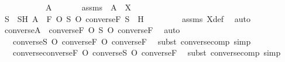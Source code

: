 \begin{isabellebody}
\ \ \isamarkupfalse%
\ {\isacharminus}{\kern0pt}\ \isanewline
\ \ \ \ \isamarkupfalse%
\ A\ \isanewline
\ \ \ \ \isamarkupfalse%
\ assms{}\ {\isacharcolon}{\kern0pt}\ {\isachardoublequoteopen}A\ {\isasymin}\ X{\isachardoublequoteclose}\isanewline
\ \ \ \ \isamarkupfalse%
\ S\ \ SH{\isacharcolon}{\kern0pt}\ {\isachardoublequoteopen}A\ {\isacharequal}{\kern0pt}\ F\ O\ S\ O\ converse{\isacharparenleft}{\kern0pt}F{\isacharparenright}{\kern0pt}{\isachardoublequoteclose}\ {\isachardoublequoteopen}S\ {\isasymin}\ H{\isachardoublequoteclose}\ \isanewline
\ \ \ \ \ \ \isamarkupfalse%
\ assms{}\ X{\isacharunderscore}{\kern0pt}def\ \isamarkupfalse%
\ auto\isanewline
\ \ \ \ \isamarkupfalse%
\ \isamarkupfalse%
\ {\isachardoublequoteopen}converse{\isacharparenleft}{\kern0pt}A{\isacharparenright}{\kern0pt}\ {\isacharequal}{\kern0pt}\ converse{\isacharparenleft}{\kern0pt}F\ O\ {\isacharparenleft}{\kern0pt}S\ O\ converse{\isacharparenleft}{\kern0pt}F{\isacharparenright}{\kern0pt}{\isacharparenright}{\kern0pt}{\isacharparenright}{\kern0pt}{\isachardoublequoteclose}\ \isamarkupfalse%
\ auto\ \isanewline
\ \ \ \ \isamarkupfalse%
\ \isamarkupfalse%
\ {\isachardoublequoteopen}{\isachardot}{\kern0pt}{\isachardot}{\kern0pt}{\isachardot}{\kern0pt}\ {\isacharequal}{\kern0pt}\ converse{\isacharparenleft}{\kern0pt}S\ O\ converse{\isacharparenleft}{\kern0pt}F{\isacharparenright}{\kern0pt}{\isacharparenright}{\kern0pt}\ O\ converse{\isacharparenleft}{\kern0pt}F{\isacharparenright}{\kern0pt}{\isachardoublequoteclose}\ \isamarkupfalse%
\ {\isacharparenleft}{\kern0pt}subst\ converse{\isacharunderscore}{\kern0pt}comp{\isacharcomma}{\kern0pt}\ simp{\isacharparenright}{\kern0pt}\isanewline
\ \ \ \ \isamarkupfalse%
\ \isamarkupfalse%
\ {\isachardoublequoteopen}{\isachardot}{\kern0pt}{\isachardot}{\kern0pt}{\isachardot}{\kern0pt}\ {\isacharequal}{\kern0pt}\ {\isacharparenleft}{\kern0pt}converse{\isacharparenleft}{\kern0pt}converse{\isacharparenleft}{\kern0pt}F{\isacharparenright}{\kern0pt}{\isacharparenright}{\kern0pt}\ O\ converse{\isacharparenleft}{\kern0pt}S{\isacharparenright}{\kern0pt}{\isacharparenright}{\kern0pt}\ O\ converse{\isacharparenleft}{\kern0pt}F{\isacharparenright}{\kern0pt}{\isachardoublequoteclose}\ \isamarkupfalse%
\ {\isacharparenleft}{\kern0pt}subst\ converse{\isacharunderscore}{\kern0pt}comp{\isacharcomma}{\kern0pt}\ simp{\isacharparenright}{\kern0pt}\isanewline

\end{isabellebody}
